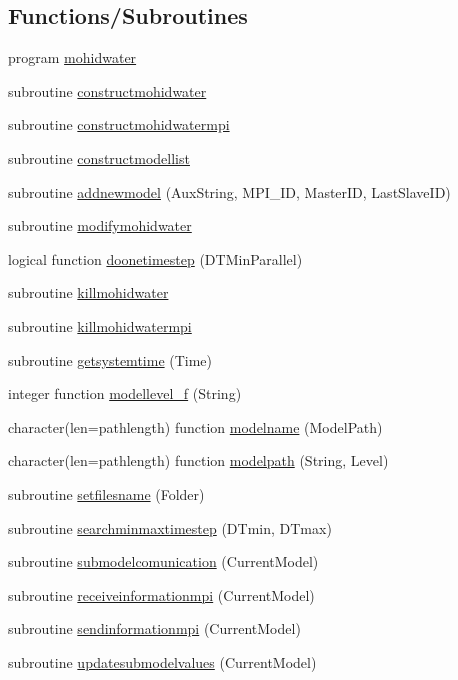 \subsection*{Functions/\+Subroutines}
\begin{DoxyCompactItemize}
\item 
program \mbox{\hyperlink{_main_8_f90_a22cacab418d9e36dcaa8c3aef44b4185}{mohidwater}}
\item 
subroutine \mbox{\hyperlink{_main_8_f90_abc6cfc7bca3f0c4dda032a34b9690319}{constructmohidwater}}
\item 
subroutine \mbox{\hyperlink{_main_8_f90_a364d1a7b4621ef3a56c71daf2af5147e}{constructmohidwatermpi}}
\item 
subroutine \mbox{\hyperlink{_main_8_f90_a02fa61b3a3e945d0354664955c2666fb}{constructmodellist}}
\item 
subroutine \mbox{\hyperlink{_main_8_f90_a2f77a4f5e6866a09c535fb9958312f17}{addnewmodel}} (Aux\+String, M\+P\+I\+\_\+\+ID, Master\+ID, Last\+Slave\+ID)
\item 
subroutine \mbox{\hyperlink{_main_8_f90_a98b6185e00bdaa093569c6645482e68b}{modifymohidwater}}
\item 
logical function \mbox{\hyperlink{_main_8_f90_a5a877f32d8c35a58c7bd824a65b07dba}{doonetimestep}} (D\+T\+Min\+Parallel)
\item 
subroutine \mbox{\hyperlink{_main_8_f90_a5128f2face71ee4677d8367d5cb5b14b}{killmohidwater}}
\item 
subroutine \mbox{\hyperlink{_main_8_f90_afa8be84014e1a3928a646b3e9fc25c72}{killmohidwatermpi}}
\item 
subroutine \mbox{\hyperlink{_main_8_f90_a74bd4029918792f13597d8cba73a7faf}{getsystemtime}} (Time)
\item 
integer function \mbox{\hyperlink{_main_8_f90_acdc3261ecd63c8e82b3392ec60df4db9}{modellevel\+\_\+f}} (String)
\item 
character(len=pathlength) function \mbox{\hyperlink{_main_8_f90_af0ae0b978e6573bc461573aa66062e83}{modelname}} (Model\+Path)
\item 
character(len=pathlength) function \mbox{\hyperlink{_main_8_f90_ada5b220b45dcba73a75264dcde43e3bd}{modelpath}} (String, Level)
\item 
subroutine \mbox{\hyperlink{_main_8_f90_a9860c624aeb5adadafab3c941c17395e}{setfilesname}} (Folder)
\item 
subroutine \mbox{\hyperlink{_main_8_f90_a21af06ec88c487727156f8a6158380c6}{searchminmaxtimestep}} (D\+Tmin, D\+Tmax)
\item 
subroutine \mbox{\hyperlink{_main_8_f90_a7e852b1ed4379c79f70b17003d08f3c5}{submodelcomunication}} (Current\+Model)
\item 
subroutine \mbox{\hyperlink{_main_8_f90_a27516f33f4d1cea85cbc73fd9de518e6}{receiveinformationmpi}} (Current\+Model)
\item 
subroutine \mbox{\hyperlink{_main_8_f90_a2d87b03d6958553abb9960de430dc290}{sendinformationmpi}} (Current\+Model)
\item 
subroutine \mbox{\hyperlink{_main_8_f90_a4c5ecbd810307fa557d4b4e6719c7fd1}{updatesubmodelvalues}} (Current\+Model)
\end{DoxyCompactItemize}


